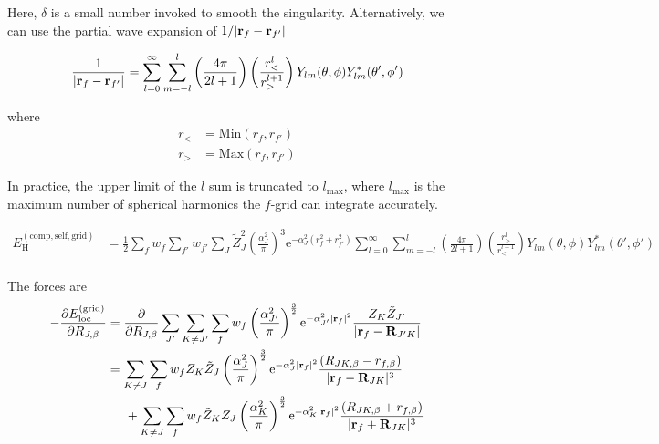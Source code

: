 \documentclass[paper=a4, fontsize=11pt]{article} %
\numberwithin{equation}{section} %
\numberwithin{figure}{section} %
\numberwithin{table}{section} %
\newcommand{\p}{\partial}
\newcommand{\br}{{\bf{r}}}
\newcommand{\bR}{{\bf{R}}}
\newcommand{\rself}{{\mathrm{self}}}
\newcommand{\re}{{\mathrm{e}}}
\newcommand{\rH}{{\mathrm{H}}}
\newcommand{\rcomp}{{\mathrm{comp}}}
\newcommand{\rgrid}{{\mathrm{grid}}}
\newcommand{\rlo}{{\mathrm{loc}}}
\newcommand{\al}{{\alpha}}
\newcommand{\RJb}{{R_{J,\beta}}}
\begin{document}
Here, $\delta$ is a small number invoked to smooth the singularity. Alternatively, we can use the partial wave expansion of $1/|\br_f-\br_{f'}|$

\begin{equation}
\frac{1}{|\br_f-\br_{f'}|} = \sum_{l=0}^\infty \sum_{m=-l}^l \left( \frac{4\pi}{2l+1}\right) \left( \frac{r_{<}^{l}}{r_{>}^{l+1}} \right) Y_{lm} (\theta,\phi) Y_{lm}^* (\theta',\phi') 
\end{equation}

where
\begin{equation}
\begin{split}
r_{<} &= \mathrm{Min}(r_f, r_{f'}) \\
r_{>} &= \mathrm{Max}(r_f, r_{f'})
\end{split}
\end{equation}

In practice, the upper limit of the $l$ sum is truncated to $l_{\mathrm{max}}$, where $l_{\mathrm{max}}$ is the maximum number of spherical harmonics the $f$-grid can integrate accurately.

\begin{equation}
\begin{split}
E_{\rH}^{(\rcomp,\rself,\rgrid)}
&= \frac{1}{2}\sum_f w_f \sum_{f'} w_{f'} \sum_J \tilde Z_J^2 \left(\frac{\al_J^2}{\pi}\right)^3 \re^{-\al_J^2 \left(r_f^2+r_{f'}^2\right)}\sum_{l=0}^\infty \sum_{m=-l}^l \left( \frac{4\pi}{2l+1}\right) \left( \frac{r_{>}^{l}}{r_{<}^{l+1}} \right) Y_{lm} (\theta,\phi) Y_{lm}^* (\theta',\phi') \\
\end{split}
\end{equation}

The forces are
\begin{equation}
\begin{split}
-\frac{\p E_{\rlo}^{(\rgrid)}}{\p \RJb} &= \frac{\p}{\p \RJb}\sum_{J'} \sum_{K \neq J'}\sum_f w_f \left(\frac{\al_{J'}^2}{\pi}\right)^{\frac{3}{2}}\re^{-\al_{J'}^2|\br_f|^2} \frac{Z_K\tilde Z_{J'}}{|\br_f - \bR_{J'K}|} \\
&= \sum_{K \neq J} \sum_f w_f Z_K\tilde Z_{J}\left(\frac{\al_{J}^2}{\pi}\right)^{\frac{3}{2}} \re^{-\al_{J}^2|\br_f|^2}\frac{\left(R_{JK,\beta}-r_{f,\beta}\right)}{|\br_f - \bR_{JK}|^3}\\
&\hspace{5mm} +\sum_{K \neq J} \sum_f w_f \tilde Z_K Z_{J}\left(\frac{\al_{K}^2}{\pi}\right)^{\frac{3}{2}} \re^{-\al_{K}^2|\br_f|^2}\frac{\left(R_{JK,\beta}+r_{f,\beta}\right)}{|\br_f + \bR_{JK}|^3}\\ 
\end{split}
\end{equation}
\end{document}
